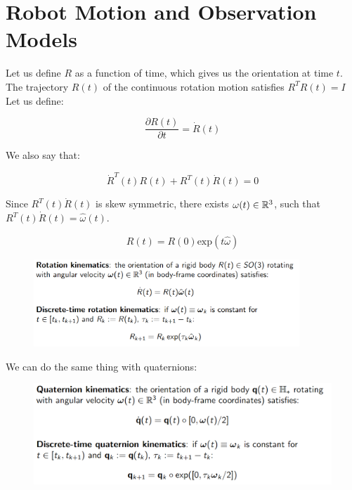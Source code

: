 \chapter{Robot Motion and Observation Models}
\graphicspath{{../../img/}}

Let us define $R$ as a function of time, which gives us the orientation at time $t$. The trajectory $R(t)$ of the continuous rotation motion satisfies $R^TR(t)=I$
Let us define:

\begin{equation*}
    \frac{\partial R(t)}{\partial t} = \dot{R}(t)
\end{equation*}

We also say that:

\begin{equation*}
    \dot{R}^T(t)R(t) + R^T(t)\dot{R}(t) = 0
\end{equation*}

Since $R^T(t)\dot{R}(t)$ is skew symmetric, there exists $\omega(t)\in \mathbb{R}^3$, such that $R^T(t)\dot{R}(t) = \hat{\omega}(t)$.

\begin{equation*}
    R(t) = R(0)\text{exp}(t\hat{\omega})
\end{equation*}

\begin{figure}[h]\centering\includegraphics[width=10cm]{img/j_4_1.png}\end{figure}

We can do the same thing with quaternions:

\begin{figure}[h]\centering\includegraphics[width=12cm]{img/j_4_2.png}\end{figure}

